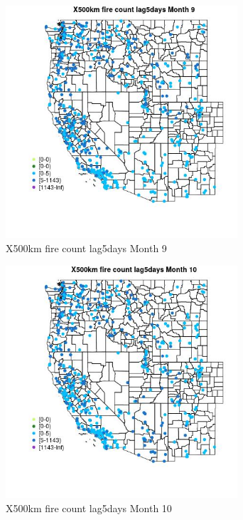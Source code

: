 \begin{figure} 
\centering  
\includegraphics[width=0.77\textwidth]{Code_Outputs/Report_ML_input_PM25_Step4_part_e_de_duplicated_aves_compiled_2019-05-14wNAs_MapObsMo9X500km_fire_count_lag5days.jpg} 
\caption{\label{fig:Report_ML_input_PM25_Step4_part_e_de_duplicated_aves_compiled_2019-05-14wNAsMapObsMo9X500km_fire_count_lag5days}X500km fire count lag5days Month 9} 
\end{figure} 
 

\clearpage 

\begin{figure} 
\centering  
\includegraphics[width=0.77\textwidth]{Code_Outputs/Report_ML_input_PM25_Step4_part_e_de_duplicated_aves_compiled_2019-05-14wNAs_MapObsMo10X500km_fire_count_lag5days.jpg} 
\caption{\label{fig:Report_ML_input_PM25_Step4_part_e_de_duplicated_aves_compiled_2019-05-14wNAsMapObsMo10X500km_fire_count_lag5days}X500km fire count lag5days Month 10} 
\end{figure} 
 

